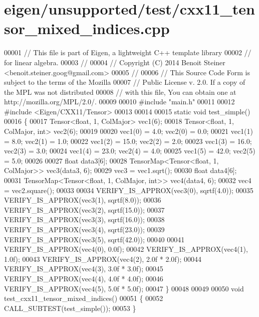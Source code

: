 \hypertarget{eigen_2unsupported_2test_2cxx11__tensor__mixed__indices_8cpp_source}{}\section{eigen/unsupported/test/cxx11\+\_\+tensor\+\_\+mixed\+\_\+indices.cpp}
\label{eigen_2unsupported_2test_2cxx11__tensor__mixed__indices_8cpp_source}

\begin{DoxyCode}
00001 \textcolor{comment}{// This file is part of Eigen, a lightweight C++ template library}
00002 \textcolor{comment}{// for linear algebra.}
00003 \textcolor{comment}{//}
00004 \textcolor{comment}{// Copyright (C) 2014 Benoit Steiner <benoit.steiner.goog@gmail.com>}
00005 \textcolor{comment}{//}
00006 \textcolor{comment}{// This Source Code Form is subject to the terms of the Mozilla}
00007 \textcolor{comment}{// Public License v. 2.0. If a copy of the MPL was not distributed}
00008 \textcolor{comment}{// with this file, You can obtain one at http://mozilla.org/MPL/2.0/.}
00009 
00010 \textcolor{preprocessor}{#include "main.h"}
00011 
00012 \textcolor{preprocessor}{#include <Eigen/CXX11/Tensor>}
00013 
00014 
00015 \textcolor{keyword}{static} \textcolor{keywordtype}{void} test\_simple()
00016 \{
00017   Tensor<float, 1, ColMajor> vec1(6);
00018   Tensor<float, 1, ColMajor, int> vec2(6);
00019 
00020   vec1(0) = 4.0;  vec2(0) = 0.0;
00021   vec1(1) = 8.0;  vec2(1) = 1.0;
00022   vec1(2) = 15.0; vec2(2) = 2.0;
00023   vec1(3) = 16.0; vec2(3) = 3.0;
00024   vec1(4) = 23.0; vec2(4) = 4.0;
00025   vec1(5) = 42.0; vec2(5) = 5.0;
00026 
00027   \textcolor{keywordtype}{float} data3[6];
00028   TensorMap<Tensor<float, 1, ColMajor>> vec3(data3, 6);
00029   vec3 = vec1.sqrt();
00030   \textcolor{keywordtype}{float} data4[6];
00031   TensorMap<Tensor<float, 1, ColMajor, int>> vec4(data4, 6);
00032   vec4 = vec2.square();
00033 
00034   VERIFY\_IS\_APPROX(vec3(0), sqrtf(4.0));
00035   VERIFY\_IS\_APPROX(vec3(1), sqrtf(8.0));
00036   VERIFY\_IS\_APPROX(vec3(2), sqrtf(15.0));
00037   VERIFY\_IS\_APPROX(vec3(3), sqrtf(16.0));
00038   VERIFY\_IS\_APPROX(vec3(4), sqrtf(23.0));
00039   VERIFY\_IS\_APPROX(vec3(5), sqrtf(42.0));
00040 
00041   VERIFY\_IS\_APPROX(vec4(0), 0.0f);
00042   VERIFY\_IS\_APPROX(vec4(1), 1.0f);
00043   VERIFY\_IS\_APPROX(vec4(2), 2.0f * 2.0f);
00044   VERIFY\_IS\_APPROX(vec4(3), 3.0f * 3.0f);
00045   VERIFY\_IS\_APPROX(vec4(4), 4.0f * 4.0f);
00046   VERIFY\_IS\_APPROX(vec4(5), 5.0f * 5.0f);
00047 \}
00048 
00049 
00050 \textcolor{keywordtype}{void} test\_cxx11\_tensor\_mixed\_indices()
00051 \{
00052   CALL\_SUBTEST(test\_simple());
00053 \}
\end{DoxyCode}
